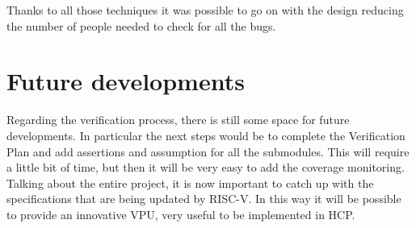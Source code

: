 Thanks to all those techniques it was possible to go on with the design reducing the number of people needed to check for all the bugs.\\

\section{Future developments}
Regarding the verification process, there is still some space for future developments. In particular the next steps would be to complete the Verification Plan and add assertions and assumption for all the submodules. This will require a little bit of time, but then it will be very easy to add the coverage monitoring. \\

Talking about the entire project, it is now important to catch up with the specifications that are being updated by RISC-V. In this way it will be possible to provide an innovative VPU, very useful to be implemented in HCP.